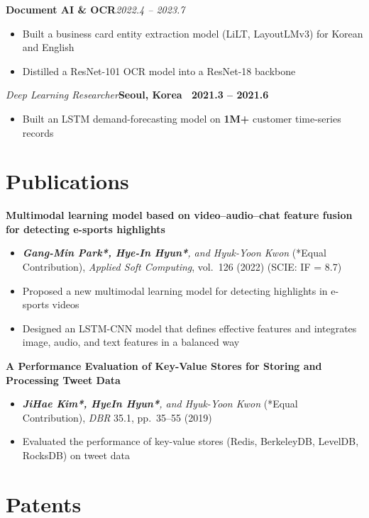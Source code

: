 \documentclass[10pt,a4paper]{article}
\newcommand{\entry}[2]{\par\noindent#1\hfill#2\par}
\newcommand{\job}[3]{\par\vspace{3pt}%
  \entry{{\fontsize{11}{13}\selectfont\bfseries\scshape #1}%
         \enspace{\color{black!45}\textbar}\enspace\textit{#2}}%
        {\textbf{#3}}%
  \vspace{1pt}}
\newcommand{\project}[2]{\par\vspace{5pt}\entry{\textbf{#1}}{\textit{#2}}}
\newcommand{\titled}[2]{\par\vspace{3pt}\entry{\textbf{#1}}{\textbf{#2}}}
\begin{document}
\project{Document AI \& OCR}{2022.4 -- 2023.7}
\begin{itemize}
  \item Built a business card entity extraction model (LiLT, LayoutLMv3) for Korean and English
  \item Distilled a ResNet-101 OCR model into a ResNet-18 backbone
\end{itemize}

\vspace{6pt}
\job{Hyundai Card}{Deep Learning Researcher}{Seoul, Korea \textbar\ 2021.3 -- 2021.6}
\begin{itemize}
  \item Built an LSTM demand-forecasting model on \textbf{1M+} customer time-series records
\end{itemize}

\section{Publications}

\titled{Multimodal learning model based on video--audio--chat feature fusion for detecting e-sports highlights}{}
\begin{itemize}
  \item \textbf{\textit{Gang-Min Park*, Hye-In Hyun*}}\textit{, and Hyuk-Yoon Kwon}
        (*Equal Contribution), \textit{Applied Soft Computing}, vol.~126 (2022)
        (SCIE: IF = 8.7)
  \item Proposed a new multimodal learning model for detecting highlights in e-sports videos
  \item Designed an LSTM-CNN model that defines effective features and integrates image, audio,
        and text features in a balanced way
\end{itemize}

\titled{A Performance Evaluation of Key-Value Stores for Storing and Processing Tweet Data}{}
\begin{itemize}
  \item \textbf{\textit{JiHae Kim*, HyeIn Hyun*}}\textit{, and Hyuk-Yoon Kwon}
        (*Equal Contribution), \textit{DBR} 35.1, pp.~35--55 (2019)
  \item Evaluated the performance of key-value stores (Redis, BerkeleyDB, LevelDB, RocksDB) on tweet data
\end{itemize}

\section{Patents}
\end{document}
